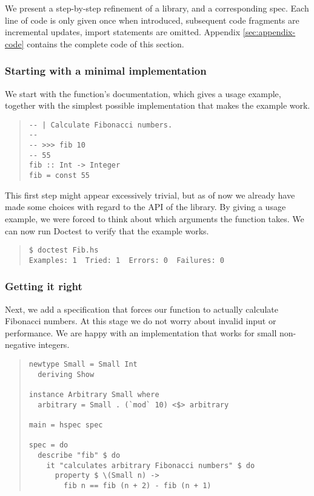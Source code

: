 \documentclass[preprint]{sigplanconf}
\begin{document}
We present a step-by-step refinement of a library, and a corresponding
spec.  Each line of code is only given once when introduced,
subsequent code fragments are incremental updates, import statements
are omitted.  Appendix
\ref{sec:appendix-code} contains the complete code of this section.

\subsubsection{Starting with a minimal implementation}

We start with the function's documentation, which gives a usage
example, together with the simplest possible implementation that makes
the example work.

\begin{quote}
\small
\begin{verbatim}
-- | Calculate Fibonacci numbers.
--
-- >>> fib 10
-- 55
fib :: Int -> Integer
fib = const 55
\end{verbatim}
\end{quote}

\noindent This first step might appear excessively trivial, but as of now we
already have made some choices with regard to the API of the library.
By giving a usage example, we were forced to think about which
arguments the function takes.  We can now run Doctest to verify that
the example works.

\begin{quote}
\small
\begin{verbatim}
$ doctest Fib.hs
Examples: 1  Tried: 1  Errors: 0  Failures: 0
\end{verbatim}
\end{quote}


\subsubsection{Getting it right}

Next, we add a specification that forces our function to actually
calculate Fibonacci numbers.
At this stage we do not worry about invalid input or performance.  We
are happy with an implementation that works for small non-negative
integers.

\begin{quote}
\small
\begin{verbatim}
newtype Small = Small Int
  deriving Show

instance Arbitrary Small where
  arbitrary = Small . (`mod` 10) <$> arbitrary

main = hspec spec

spec = do
  describe "fib" $ do
    it "calculates arbitrary Fibonacci numbers" $ do
      property $ \(Small n) ->
        fib n == fib (n + 2) - fib (n + 1)
\end{verbatim}
\end{quote}
\end{document}

